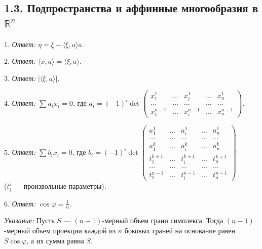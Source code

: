 	\subsection{1.3. Подпространства и аффинные многообразия в $\mathbb{R}^n$}

	1. \textit{Ответ:} $\eta = \xi - \langle \xi, a \rangle a$.

	2. \textit{Ответ:} $\langle x, a \rangle = \langle \xi, a \rangle$.

	3. \textit{Ответ:} $|\langle \xi, a \rangle|$.

	4. \textit{Ответ:} $\sum a_i x_i = 0$, где $a_i = (-1)^i \det \begin{pmatrix} x^1_1 & \dots & x^1_i & \dots & x^1_n \\ \dots & \dots & \dots & \dots & \dots \\ x^{n-1}_1 & \dots & x^{n-1}_i & \dots & x^{n-1}_n \end{pmatrix}$.

	5. \textit{Ответ:} $\sum b_i x_i = 0$, где $b_i = (-1)^i \det \begin{pmatrix} a^1_1 & \dots & a^1_i & \dots & a^1_n \\ \dots & \dots & \dots & \dots & \dots \\ a^k_1 & \dots & a^k_i & \dots & a^k_n \\ t^{k+1}_1 & \dots & t^{k+1}_i & \dots & t^{k+1}_n \\ \dots & \dots & \dots & \dots & \dots \\ t^{n-1}_1 & \dots & t^{n-1}_i & \dots & t^{n-1}_n \end{pmatrix}$ \\
	($t^j_i$ — произвольные параметры).

	6. \textit{Ответ:} $\cos \varphi = \frac{1}{n}$.

	\textit{Указание:} Пусть $S$ — $(n-1)$-мерный объем грани симплекса. Тогда $(n-1)$-мерный объем проекции каждой из $n$ боковых граней на основание равен $S \cos \varphi$, а их сумма равна $S$.

% 

